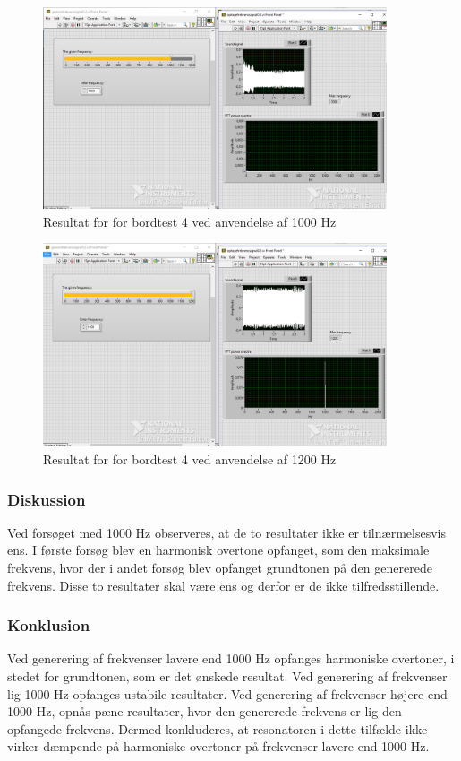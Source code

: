 			\begin{figure}[htb]
			\centering
				\includegraphics[width=4in]{Bordtest41000Hzb}
				\caption{Resultat for for bordtest 4 ved anvendelse af 1000 Hz}	
				\label{fig:bt41000b}
			\end{figure} 
			
			\begin{figure}[htb]
			\centering
				\includegraphics[width=4in]{Bordtest41200Hz}
				\caption{Resultat for for bordtest 4 ved anvendelse af 1200 Hz}	
				\label{fig:bt41200}
			\end{figure} 
	
			  
			\subsubsection{Diskussion}
			Ved forsøget med 1000 Hz observeres, at de to resultater ikke er tilnærmelsesvis ens. I første forsøg blev en harmonisk overtone opfanget, som den maksimale frekvens, hvor der i andet forsøg blev opfanget grundtonen på den genererede frekvens. Disse to resultater skal være ens og derfor er de ikke tilfredsstillende.
			
			\subsubsection{Konklusion}
			Ved generering af frekvenser lavere end 1000 Hz opfanges harmoniske overtoner, i stedet for grundtonen, som er det ønskede resultat. 
			Ved generering af frekvenser lig 1000 Hz opfanges ustabile resultater. 
			Ved generering af frekvenser højere end 1000 Hz, opnås pæne resultater, hvor den genererede frekvens er lig den opfangede frekvens.  
			Dermed konkluderes, at resonatoren i dette tilfælde ikke virker dæmpende på harmoniske overtoner på frekvenser lavere end 1000 Hz. 
			  
